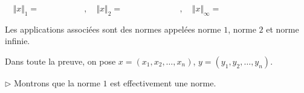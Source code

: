 \documentclass[french,11pt,twoside]{VcCours}
\begin{document}
$$\Vert x \Vert_1  = \phantom{\sum_{i=1}^n \vert x_i \vert} \qquad, \quad \Vert x \Vert_2  = \phantom{\sqrt{\sum_{i=1}^n \vert x_i \vert^2 }} \qquad, \quad \Vert x \Vert_{\infty}  = \phantom{\sup_{i \in \ii{1}{n}} \vert x_i \vert = \max_{i \in \ii{1}{n}} \vert x_i \vert }$$
Les applications associées sont des normes appelées norme $1$, norme $2$ et norme infinie.

\medskip

\begin{Demonstration}{} Dans toute la preuve, on pose $x=(x_1, x_2, \ldots, x_n)$, $y=(y_1, y_2, \ldots,y_n)$.

\medskip

$\rhd$ Montrons que la norme $1$ est effectivement une norme. 

\newpage

\vspace*{6cm}
%


\end{Demonstration}
\end{document}
